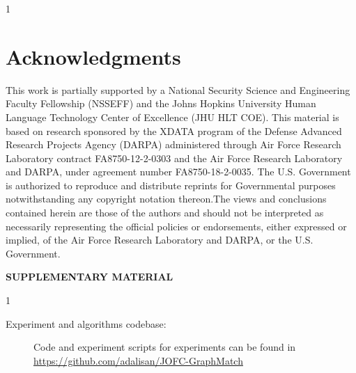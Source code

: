 \documentclass[12pt]{article}
\newcommand{\blind}{1}
\numberwithin{equation}{section}
\theoremstyle{definition}
\begin{document}
\blind {
\section{Acknowledgments}
This work is partially supported by a
National Security Science and Engineering Faculty Fellowship (NSSEFF)
and the
Johns Hopkins University Human Language Technology Center of Excellence
(JHU HLT COE).
This material is based on research sponsored by the XDATA program of the
Defense Advanced Research Projects Agency (DARPA) administered through
Air Force Research Laboratory contract FA8750-12-2-0303 and the Air
Force Research Laboratory and DARPA, under agreement number FA8750-18-2-0035. 
The U.S. Government is authorized to reproduce and distribute reprints
for Governmental purposes notwithstanding any copyright notation
thereon.The views and conclusions contained herein are those of the
authors and should not be interpreted as necessarily representing the
official policies or endorsements, either expressed or implied, of the
Air Force Research Laboratory and DARPA, or the U.S. Government.
} \fi
\newpage

\bigskip
\begin{center}
{\large\bf SUPPLEMENTARY MATERIAL}
\end{center}

\blind {
\begin{description}

\item[Experiment and algorithms codebase:] 


  Code and experiment scripts for experiments can be found in \url{https://github.com/adalisan/JOFC-GraphMatch}


\end{description}
} \fi
\newpage




\end{document}
